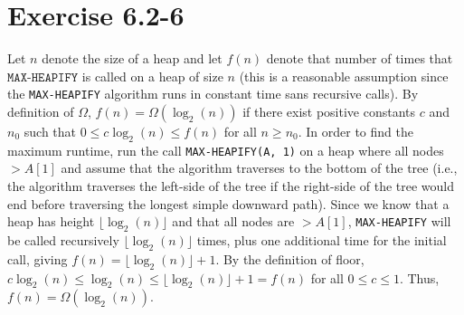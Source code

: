 \documentclass{article}
\begin{document}
\section*{Exercise 6.2-6}

Let $n$ denote the size of a heap and let $f(n)$ denote that number of times that $\texttt{MAX-HEAPIFY}$ is called on a heap of size $n$ (this is a reasonable assumption since the \texttt{MAX-HEAPIFY} algorithm runs in constant time sans recursive calls). By definition of $\Omega$, $f(n) = \Omega(\log_2(n))$ if there exist positive constants $c$ and $n_0$ such that $0 \leq c \log_2(n) \leq f(n)$ for all $n \geq n_0$. In order to find the maximum runtime, run the call \texttt{MAX-HEAPIFY(A, 1)} on a heap where all nodes $> A[1]$ and assume that the algorithm traverses to the bottom of the tree (i.e., the algorithm traverses the left-side of the tree if the right-side of the tree would end before traversing the longest simple downward path). Since we know that a heap has height $\lfloor \log_2(n) \rfloor$ and that all nodes are $> A[1]$, \texttt{MAX-HEAPIFY} will be called recursively $\lfloor \log_2(n) \rfloor$ times, plus one additional time for the initial call, giving $f(n) = \lfloor \log_2(n) \rfloor + 1$. By the definition of floor, $c \log_2(n) \leq \log_2(n) \leq \lfloor \log_2(n) \rfloor + 1 = f(n)$ for all $0 \leq c \leq 1$. Thus, $f(n) = \Omega(\log_2(n))$.
\end{document}
